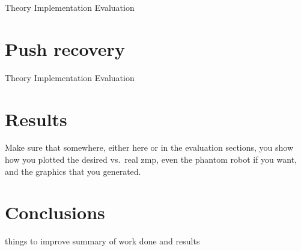 \documentclass[english,ngerman]{KITreprt}
\begin{document}
Theory Implementation Evaluation

\chapter{Push recovery}\label{push-recovery}

Theory Implementation Evaluation

\chapter{Results}\label{results}

Make sure that somewhere, either here or in the evaluation sections, you
show how you plotted the desired vs.~real zmp, even the phantom robot if
you want, and the graphics that you generated.

\chapter{Conclusions}\label{conclusions}

things to improve summary of work done and results



\end{document}
